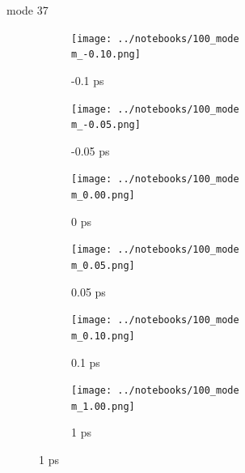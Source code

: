 \documentclass{beamer}
\newcommand\w{0.32}
\begin{document}
\renewcommand\m{37}
\begin{frame}{mode \m}
	\begin{figure}
		\centering
		\begin{subfigure}[b]{\w\textwidth}
			\centering
			\texttt{[image: ../notebooks/100\_mode\\m\_-0.10.png]}
			\caption{-0.1 ps}
		\end{subfigure}
		\begin{subfigure}[b]{\w\textwidth}
			\centering
			\texttt{[image: ../notebooks/100\_mode\\m\_-0.05.png]}
			\caption{-0.05 ps}
		\end{subfigure}
		\begin{subfigure}[b]{\w\textwidth}
			\centering
			\texttt{[image: ../notebooks/100\_mode\\m\_0.00.png]}
			\caption{0 ps}
		\end{subfigure}
		\begin{subfigure}[b]{\w\textwidth}
			\centering
			\texttt{[image: ../notebooks/100\_mode\\m\_0.05.png]}
			\caption{0.05 ps}
		\end{subfigure}
		\begin{subfigure}[b]{\w\textwidth}
			\centering
			\texttt{[image: ../notebooks/100\_mode\\m\_0.10.png]}
			\caption{0.1 ps}
		\end{subfigure}
		\begin{subfigure}[b]{\w\textwidth}
			\centering
			\texttt{[image: ../notebooks/100\_mode\\m\_1.00.png]}
			\caption{1 ps}
		\end{subfigure}
	\end{figure}
\end{frame}
\end{document}
